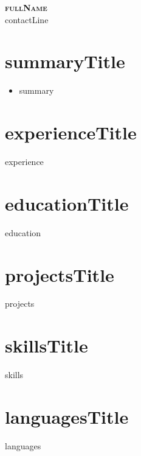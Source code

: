 \documentclass[letterpaper,9pt]{article}
\begin{document}
\begin{center}
    \textbf{\Huge \scshape {{fullName}}} \\[3pt]
    \footnotesize {{contactLine}}
\end{center}
\vspace{-5pt}

\section{{{summaryTitle}}}
\begin{itemize}[leftmargin=0.18in, label={}, itemsep=1.2pt, topsep=1.5pt, parsep=0pt]
\item \footnotesize {{summary}}
\end{itemize}\vspace{-3pt}

\section{{{experienceTitle}}}
{{experience}}\vspace{-2pt}

\section{{{educationTitle}}}
{{education}}\vspace{-1pt}

\section{{{projectsTitle}}}
{{projects}}\vspace{-3pt}

\section{{{skillsTitle}}}
{{skills}}\vspace{-3pt}

\section{{{languagesTitle}}}
{{languages}}
\end{document}
